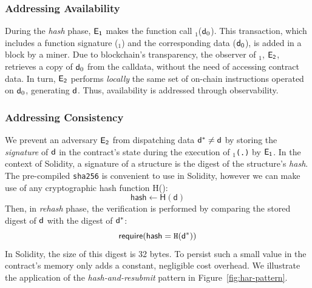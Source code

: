 \subsubsection{Addressing Availability} During the \emph{hash} phase,
$\mathsf{E_{1}}$ makes the function call \texttt{\proc}$_1$($\mathsf{d}_0$). This
transaction, which includes a function signature (\texttt{\proc$_1$}) and the
corresponding data ($\mathsf{d}_0$), is added in a block by a miner. Due to
blockchain's transparency, the observer of \texttt{\proc}$_1$, $\mathsf{E_{2}}$,
retrieves a copy of $\mathsf{d}_0$ from the calldata, without the need of accessing contract data. In
turn, $\mathsf{E_{2}}$ performs \emph{locally} the same set of on-chain instructions
operated on $\mathsf{d}_0$, generating $\mathsf{d}$. Thus, availability is addressed
through observability.

\subsubsection{Addressing Consistency} We prevent an adversary $\mathsf{E_{2}}$
from dispatching data $\mathsf{d^*}\neq\mathsf{d}$ by storing the \emph{signature} of
$\mathsf{d}$ in the contract's state during the execution of \texttt{\proc$_1$(.)} by
$\mathsf{E_{1}}$. In the context of Solidity, a signature of a structure is the
digest of the structure's \emph{hash}. The pre-compiled \texttt{sha256} is
convenient to use in Solidity, however we can make use of any cryptographic
hash function \textsf{H()}: \[\textsf{hash} \gets \textsf{H}(\textsf{d})\]
Then, in \emph{rehash} phase, the verification is performed by comparing the
stored digest of $\mathsf{d}$ with the digest of $\mathsf{d^*}$:
\[\textsf{require}(\textsf{hash} = \texttt{H}(\mathsf{d^*}))\] \noindent In Solidity,
the size of this digest is 32 bytes. To persist such a small value in the
contract's memory only adds a constant, negligible cost overhead. We illustrate
the application of the \emph{hash-and-resubmit} pattern in
Figure~\ref{fig:har-pattern}.

